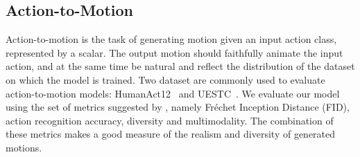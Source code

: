 \begin{table}[tbh]
\centering


 \caption{\textbf{Evaluation of action-to-motion on the UESTC dataset.} The performance improvement with our 
model shows a clear gap from state-of-the-art. 
\textbf{Bold} indicates best result,  indicates second best,  indicates 95\% confidence interval,  indicates that closer to real is better.}
\label{tab:uestc}
\end{table}
\vspace{-10pt}
 
\subsection{Action-to-Motion}
\vspace{-5pt}

\label{sec:a2m}
Action-to-motion is the task of generating motion given an input action class, represented by a scalar. The output motion should faithfully animate the input action, and at the same time be natural and reflect the distribution of the dataset on which the model is trained. Two dataset are commonly used to evaluate action-to-motion models: HumanAct12~\citep{guo2020action2motion} and UESTC~\citep{ji2018large}. We evaluate our model using the set of metrics suggested by \citet{guo2020action2motion}, namely Fr\'{e}chet Inception Distance (FID), action recognition accuracy, diversity and multimodality. The combination of these metrics makes a good measure of the realism and diversity of generated motions.

